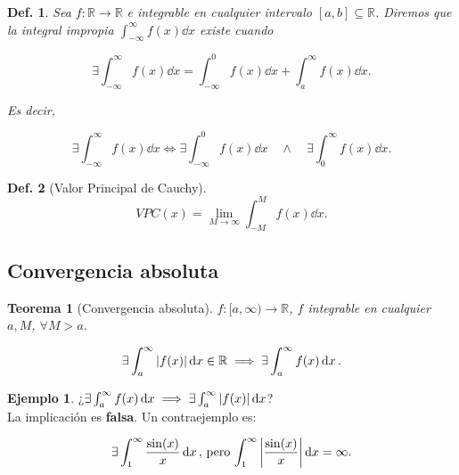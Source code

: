 \documentclass{article}
\theoremstyle{definicion}
\newtheorem{definicion}{Def.}
\theoremstyle{definition}             %
\theoremstyle{definition}             %
\theoremstyle{definition}
\theoremstyle{definition}
\theoremstyle{observacion}
\theoremstyle{definition}
\theoremstyle{plain}
\newtheorem{theorem}{Teorema}
\theoremstyle{definition}
\newtheorem{exe}{Ejemplo}
\theoremstyle{afirmacion}
\theoremstyle{definition}
\begin{document}
    \begin{definicion}
        Sea \(f\colon \mathbb{R}\to\mathbb{R}\) e integrable en cualquier intervalo \([a,b]\subseteq \mathbb{R}\). Diremos que la integral impropia \(\int_{-\infty}^{\infty}f(x)\dd{x}\) existe cuando 

        \begin{equation*}
            \exists \int_{-\infty}^{\infty}f(x)\dd{x} = \int_{-\infty}^{0}f(x)\dd{x} + \int_{a}^{\infty}f(x)\dd{x}.
        \end{equation*}

        Es decir,

        \begin{equation*}
            \exists \int_{-\infty}^{\infty}f(x)\dd{x} \Leftrightarrow \exists \int_{-\infty}^{0}f(x)\dd{x}\quad \wedge \quad \exists\int_{0}^{\infty}f(x)\dd{x}.
        \end{equation*}
    \end{definicion}

    \begin{definicion}[Valor Principal de Cauchy]
        \begin{equation*}
            VPC(x) = \lim_{M\to\infty} \int_{-M}^{M}f(x)\dd{x}.
        \end{equation*}
    \end{definicion}

    \subsection{Convergencia absoluta}

    \begin{theorem}[Convergencia absoluta]
        \(f\colon [a,\infty) \to \mathbb{R}\), \(f\) integrable en cualquier \(a, M\), \(\forall M > a\).
        
        \begin{equation*}
            \exists \int_{a}^{\infty} \abs{f(x)}\dd{x} \in \mathbb{R} \implies \exists \int_{a}^{\infty}f(x)\dd{x}.
        \end{equation*}
    \end{theorem}

    \begin{exe}
        ¿\(\exists \int_{a}^{\infty}f(x)\dd{x} \implies \exists \int_{a}^{\infty}\abs{f(x)}\dd{x}\)?\\
        La implicación es \textbf{falsa}. Un contraejemplo es:

        \begin{equation*}
            \exists\int_{1}^{\infty}\dfrac{\sin(x)}{x}\dd{x},\, \text{pero}\, \int_{1}^{\infty}\abs{\dfrac{\sin(x)}{x}}\dd{x} = \infty.
        \end{equation*}
    \end{exe}
\end{document}
